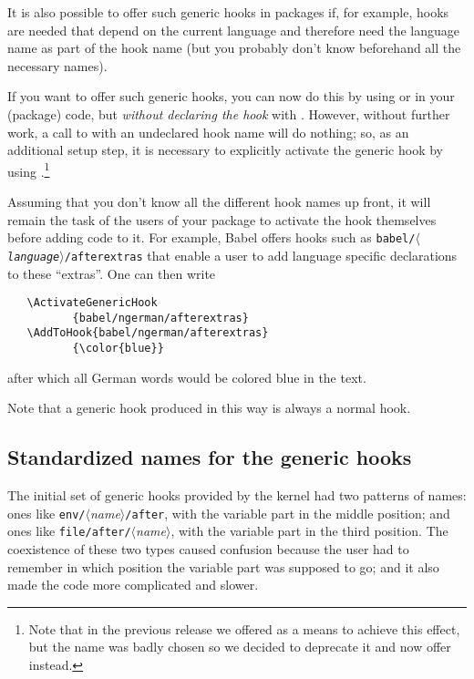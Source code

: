 \documentclass{ltnews}
\providecommand\hook[1]{\texttt{#1}}
\providecommand\meta[1]{$\langle$\textrm{\itshape#1}$\rangle$}
\begin{document}
It is also possible to offer such generic hooks in 
packages if, for example, hooks are needed that depend on the 
current language and therefore need the
language name as part of the hook name (but you probably 
don't know beforehand all the necessary names).

If you want to offer such generic hooks, you can now 
do this by using
 or  in your (package) code, but
\emph{without declaring the hook} with . However, without 
further work, a call to  with an undeclared hook name 
will do 
nothing; so, as an additional setup step, it is necessary to explicitly
activate the generic hook by using .\footnote{Note
  that in the previous release we offered  as a means
  to achieve this effect, but the name was badly chosen so we decided
  to deprecate it and now offer  instead.}

Assuming
that you don't know all the different hook names up front, it will
remain the task of the users of your package to activate the hook
themselves before adding code to it. For example, Babel offers hooks
such as \hook{babel/\meta{language}/afterextras} 
that enable a user
to add language specific declarations to these \enquote{extras}.  One can then write
\begin{verbatim}
   \ActivateGenericHook
          {babel/ngerman/afterextras}
   \AddToHook{babel/ngerman/afterextras}
          {\color{blue}}
\end{verbatim}
after which all German words would be colored blue in the text.

Note that a generic hook produced in this way is always a normal hook.

\subsection{Standardized names for the generic hooks}

The initial set of generic hooks provided by the kernel had
two patterns of names:
ones like
\verb|env/|\meta{name}\verb|/after|, 
with the variable 
part in the middle position;
and ones like
\verb|file/after/|\meta{name}, with the 
variable part in the third
position.  
%
The coexistence of these two types caused confusion because
the user had to remember in which position the variable part was
supposed to go; and it also made the code more complicated and slower.
\end{document}
